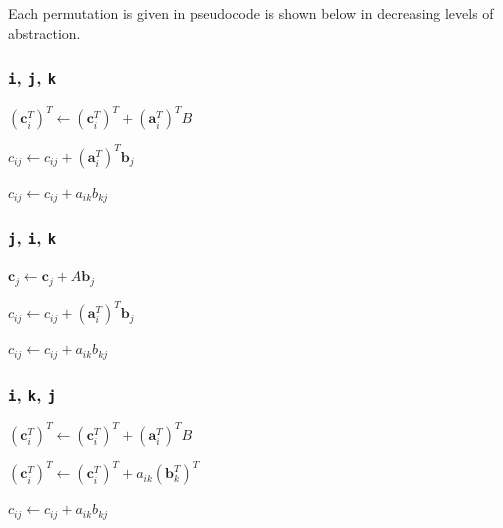 \documentclass{scrartcl}
\begin{document}
\iffalse
Each permutation is given in pseudocode is shown below in decreasing levels of abstraction.

\subsubsection*{\texttt{i}, \texttt{j}, \texttt{k}}
\begin{algorithmic}
  \State \((\mathbf{c}^T_i)^T \gets (\mathbf{c}^T_i)^T + (\mathbf{a}^T_i)^TB\)
  \EndFor
\end{algorithmic}
\begin{algorithmic}
  \State \(c_{ij} \gets c_{ij} + (\mathbf{a}^T_i)^T\mathbf{b}_j\)
  \EndFor
  \EndFor
\end{algorithmic}
\begin{algorithmic}
  \State \(c_{ij} \gets c_{ij} + a_{ik}b_{kj}\)
  \EndFor
  \EndFor
  \EndFor
\end{algorithmic}

\subsubsection*{\texttt{j}, \texttt{i}, \texttt{k}}
\begin{algorithmic}
  \State \(\mathbf{c}_j \gets \mathbf{c}_j + A\mathbf{b}_j\)
  \EndFor
\end{algorithmic}
\begin{algorithmic}
  \State \(c_{ij} \gets c_{ij} + (\mathbf{a}^T_i)^T\mathbf{b}_j\)
  \EndFor
  \EndFor
\end{algorithmic}
\begin{algorithmic}
  \State \(c_{ij} \gets c_{ij} + a_{ik}b_{kj}\)
  \EndFor
  \EndFor
  \EndFor
\end{algorithmic}

\subsubsection*{\texttt{i}, \texttt{k}, \texttt{j}}
\begin{algorithmic}
  \State \((\mathbf{c}^T_i)^T \gets (\mathbf{c}^T_i)^T + (\mathbf{a}^T_i)^TB\)
  \EndFor
\end{algorithmic}
\begin{algorithmic}
  \State \((\mathbf{c}^T_{i})^T \gets (\mathbf{c}^T_{i})^T + a_{ik}(\mathbf{b}^T_{k})^T\)
  \EndFor
  \EndFor
\end{algorithmic}
\begin{algorithmic}
  \State \(c_{ij} \gets c_{ij} + a_{ik}b_{kj}\)
  \EndFor
  \EndFor
  \EndFor
\end{algorithmic}
\end{document}
